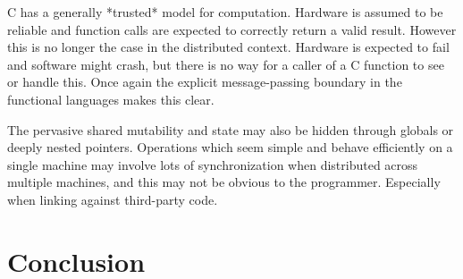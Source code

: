 \documentclass[10pt,a4paper,twocolumn]{article}
\begin{document}
C has a generally *trusted* model for computation. Hardware is assumed to be
reliable and function calls are expected to correctly return a valid result.
However this is no longer the case in the distributed context. Hardware is
expected to fail and software might crash, but there is no way for a caller of a
C function to see or handle this. Once again the explicit message-passing
boundary in the functional languages makes this clear.

The pervasive shared mutability and state may also be hidden through globals or
deeply nested pointers. Operations which seem simple and behave efficiently on a
single machine may involve lots of synchronization when distributed across
multiple machines, and this may not be obvious to the programmer. Especially
when linking against third-party code.


\section{Conclusion}





\small



\end{document}
